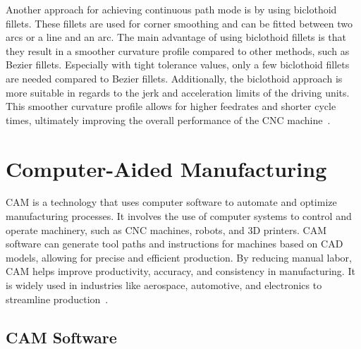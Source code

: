 Another approach for achieving continuous path mode is by using biclothoid fillets. These fillets are used for corner smoothing and can be fitted between two arcs or a line and an arc. The main advantage of using biclothoid fillets is that they result in a smoother curvature profile compared to other methods, such as Bezier fillets. Especially with tight tolerance values, only a few biclothoid fillets are needed compared to Bezier fillets. Additionally, the biclothoid approach is more suitable in regards to the jerk and acceleration limits of the driving units. This smoother curvature profile allows for higher feedrates and shorter cycle times, ultimately improving the overall performance of the \acrshort{CNC} machine~\cite{Shahzadeh.2018}. 







\section{Computer-Aided Manufacturing}\label{CAMmain}

\acrshort{CAM} is a technology that uses computer software to automate and optimize manufacturing processes. It involves the use of computer systems to control and operate machinery, such as \acrshort{CNC} machines, robots, and 3D printers. \acrshort{CAM} software can generate tool paths and instructions for machines based on \acrshort{CAD} models, allowing for precise and efficient production. By reducing manual labor, \acrshort{CAM} helps improve productivity, accuracy, and consistency in manufacturing. It is widely used in industries like aerospace, automotive, and electronics to streamline production~\cite{Bi.2021}.%

\subsection{\acrshort{CAM} Software}

